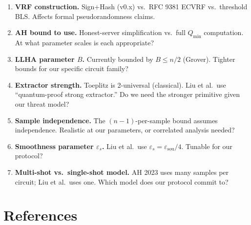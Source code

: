 \documentclass[11pt,a4paper]{article}
\theoremstyle{plain}
\theoremstyle{definition}
\theoremstyle{remark}
\begin{document}
\begin{enumerate}[itemsep=3pt,topsep=4pt]
  \item \textbf{VRF construction.} Sign+Hash (v0.x) vs.\ RFC 9381 ECVRF vs.\ threshold BLS. Affects formal pseudorandomness claims.
  \item \textbf{AH bound to use.} Honest-server simplification vs.\ full $Q_{\min}$ computation. At what parameter scales is each appropriate?
  \item \textbf{LLHA parameter $B$.} Currently bounded by $B \leq n/2$ (Grover). Tighter bounds for our specific circuit family?
  \item \textbf{Extractor strength.} Toeplitz is 2-universal (classical). Liu et al.\ use ``quantum-proof strong extractor.'' Do we need the stronger primitive given our threat model?
  \item \textbf{Sample independence.} The $(n-1)$-per-sample bound assumes independence. Realistic at our parameters, or correlated analysis needed?
  \item \textbf{Smoothness parameter $\varepsilon_s$.} Liu et al.\ use $\varepsilon_s = \varepsilon_{\mathrm{sou}}/4$. Tunable for our protocol?
  \item \textbf{Multi-shot vs.\ single-shot model.} AH 2023 uses many samples per circuit; Liu et al.\ uses one. Which model does our protocol commit to?
\end{enumerate}

\section*{References}
\end{document}
